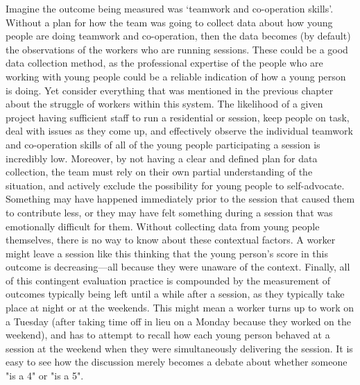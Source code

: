 Imagine the outcome being measured was `teamwork and co-operation skills'. Without a plan for how the team was going to collect data about how young people are doing teamwork and co-operation, then the data becomes (by default) the observations of the workers who are running sessions. These could be a good data collection method, as the professional expertise of the people who are working with young people could be a reliable indication of how a young person is doing. Yet consider everything that was mentioned in the previous chapter about the struggle of workers within this system. The likelihood of a given project having sufficient staff to run a residential or session, keep people on task, deal with issues as they come up, and effectively observe the individual teamwork and co-operation skills of all of the young people participating a session is incredibly low. Moreover, by not having a clear and defined plan for data collection, the team must rely on their own partial understanding of the situation, and actively exclude the possibility for young people to self-advocate. Something may have happened immediately prior to the session that caused them to contribute less, or they may have felt something during a session that was emotionally difficult for them. Without collecting data from young people themselves, there is no way to know about these contextual factors. A worker might leave a session like this thinking that the young person's score in this outcome is decreasing—all because they were unaware of the context. Finally, all of this contingent evaluation practice is compounded by the measurement of outcomes typically being left until a while after a session, as they typically take place at night or at the weekends. This might mean a worker turns up to work on a Tuesday (after taking time off in lieu on a Monday because they worked on the weekend), and has to attempt to recall how each young person behaved at a session at the weekend when they were simultaneously delivering the session. It is easy to see how the discussion merely becomes a debate about whether someone "is a 4" or "is a 5". 

